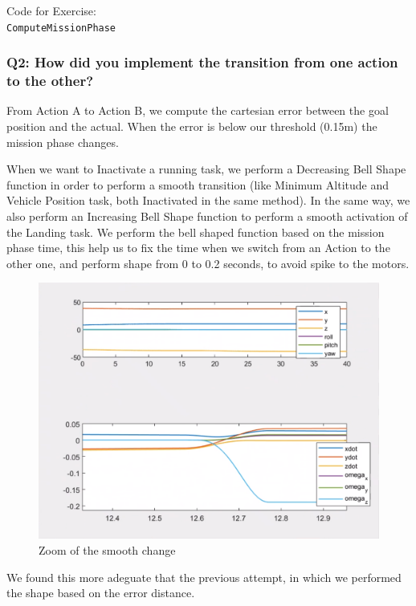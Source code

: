 \documentclass{article}
\begin{document}


\colorbox{mygray}
{\parbox{0.9\textwidth}{Code for Exercise: \\
\texttt{ComputeMissionPhase}\\
}}

\subsubsection{Q2: How did you implement the transition from one action to the other?}
From Action A to Action B, we compute the cartesian error between the goal position and the actual. When the error is below our threshold (0.15m) the mission phase changes. 

When we want to Inactivate a running task, we perform a Decreasing Bell Shape function in order to perform a smooth transition (like Minimum Altitude and Vehicle Position task, both Inactivated in the same method). In the same way, we also perform an Increasing Bell Shape function to perform a smooth activation of the Landing task. We perform the bell shaped function based on the mission phase time, this help us to fix the time when we switch from an Action to the other one, and perform shape from 0 to 0.2 seconds, to avoid spike to the motors.
\begin{figure}[!htb]
    \centering
    \includegraphics[scale=0.25]{222_smooth_ppdot.png}
    \caption{Zoom of the smooth change}
    \label{images_2_3_1}
\end{figure}

We found this more adeguate that the previous attempt, in which we performed the shape based on the error distance.
\end{document}
